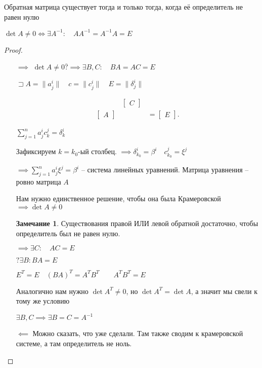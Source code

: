 \documentclass{book}
\newcommand{\ov}[1]{\overline{#1}}
\theoremstyle{definition}
\newtheorem*{note}{Замечание}
\begin{document}
\begin{lemma}
    Обратная матрица существует тогда и только тогда, когда её определитель не равен нулю

    $\det A\neq 0 \iff \exists A^{-1}:\quad A A^{-1} = A^{-1}A = E$
\end{lemma}
\begin{proof}
    \begin{itemize}
        \item []
        \item [$\implies $] $\det A \neq  0 \ov ? {\implies } \exists B, C:\quad BA = AC = E $

        $\sqsupset A = \|a^i_j\|\quad c = \|c^i_j\|\quad E = \|\delta^i_j\|$

        \begin{align*}
            &\begin{bmatrix} C \end{bmatrix} &\\
            \begin{bmatrix} A \end{bmatrix} & &=\begin{bmatrix} E \end{bmatrix} 
        .\end{align*}

        $\sum_{j=1}^{n} a^i_jc^j_k = \delta^i_k$ 

        Зафиксируем $k = k_0$-ый столбец. $\implies \delta^i_{k_0} = \beta^i\quad c^j_{k_0} = \xi^j$

        $\implies \sum_{j=1}^{n} a^i_j\xi^j = \beta^i$ -- система линейных уравнений. Матрица уравнения -- ровно матрица $A$

        Нам нужно единственное решение, чтобы она была Крамеровской  $\implies \det A \neq 0$

        \begin{note}
            Существования правой ИЛИ левой обратной достаточно, чтобы определитель был не равен нулю.
        \end{note}

        $\implies \exists C:\quad AC = E$

        $ ?\exists B: BA = E$

        $E^T = E\quad (BA)^T = A^TB^T\qquad A^TB^T = E$

        Аналогично нам нужно  $\det A^T \neq 0$, но $\det A^T = \det A$, а значит мы свели к тому же условию

        $\exists B, C \implies  \exists B=C = A^{-1}$
    \item [$\impliedby $] Можно сказать, что уже сделали. Там также сводим к крамеровской системе, а там определитель не ноль.
    \end{itemize}
\end{proof}
\end{document}

